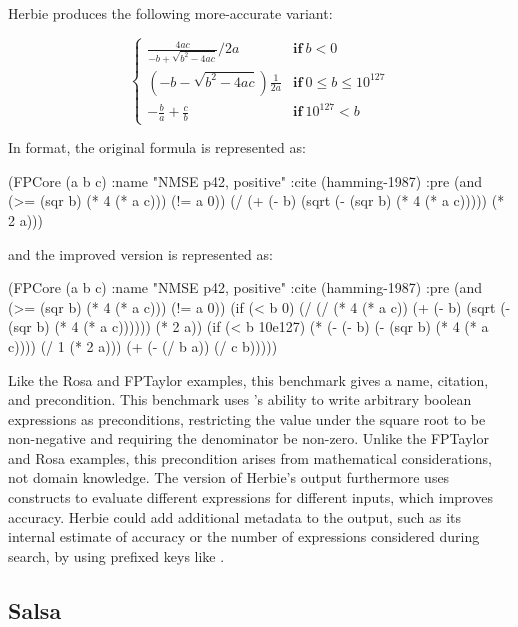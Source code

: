 \documentclass[main.tex]{subfiles}
\begin{document}
\noindent Herbie produces the following more-accurate variant:

\newcommand{\K}[1]{\mathbf{#1}\:}

\begin{equation*}
\begin{cases}
  \frac{4ac}{-b + \sqrt{b^2 - 4ac}}/2a & \K{if} b < 0 \\[9pt]
  \left(-b - \sqrt{b^2 - 4ac}\right)\frac1{2a} & \K{if} 0 \le b \le 10^{127} \\[5pt]
  -\frac{b}{a} + \frac{c}{b} & \K{if} 10^{127} < b
\end{cases}
\end{equation*}

\noindent In \core format, the original formula is represented as:

\begin{code}
(FPCore (a b c)
  :name "NMSE p42, positive"
  :cite (hamming-1987)
  :pre (and (>= (sqr b) (* 4 (* a c))) (!= a 0))
  (/ (+ (- b) (sqrt (- (sqr b) (* 4 (* a c))))) (* 2 a)))
\end{code}

\noindent and the improved version is represented as:

\begin{code}
(FPCore (a b c)
  :name "NMSE p42, positive"
  :cite (hamming-1987)
  :pre (and (>= (sqr b) (* 4 (* a c))) (!= a 0))
  (if (< b 0)
      (/ (/ (* 4 (* a c)) (+ (- b) (sqrt (- (sqr b) (* 4 (* a c)))))) 
         (* 2 a))
      (if (< b 10e127)
          (* (- (- b) (- (sqr b) (* 4 (* a c)))) (/ 1 (* 2 a)))
          (+ (- (/ b a)) (/ c b)))))
\end{code}

Like the Rosa and FPTaylor examples,
  this benchmark gives a name, citation, and precondition.
This benchmark uses \core's ability
  to write arbitrary boolean expressions as preconditions,
  restricting the value under the square root to be non-negative
  and requiring the denominator be non-zero.
Unlike the FPTaylor and Rosa examples,
  this precondition arises from mathematical considerations,
  not domain knowledge.
The \core version of Herbie's output
  furthermore uses  constructs to evaluate
  different expressions for different inputs,
  which improves accuracy.
Herbie could add additional metadata to the output,
  such as its internal estimate of accuracy
  or the number of expressions considered during search,
  by using prefixed keys like .

\subsection{Salsa}
\end{document}
